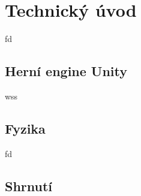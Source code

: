 \chapter{Technický úvod}
fd

\section{Herní engine Unity}
wss


\section{Fyzika}
fd

\section{Shrnutí}